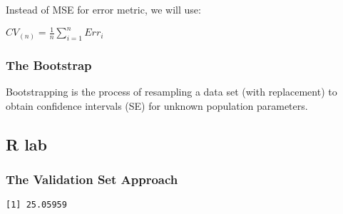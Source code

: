 \documentclass[12pt,]{report}
\newenvironment{Shaded}{\begin{snugshade}}{\end{snugshade}}
\newcommand{\CommentTok}[1]{\textcolor[rgb]{0.56,0.35,0.01}{\textit{#1}}}
\newcommand{\DataTypeTok}[1]{\textcolor[rgb]{0.13,0.29,0.53}{#1}}
\newcommand{\DecValTok}[1]{\textcolor[rgb]{0.00,0.00,0.81}{#1}}
\newcommand{\KeywordTok}[1]{\textcolor[rgb]{0.13,0.29,0.53}{\textbf{#1}}}
\newcommand{\NormalTok}[1]{#1}
\newcommand{\OperatorTok}[1]{\textcolor[rgb]{0.81,0.36,0.00}{\textbf{#1}}}
\newcommand{\StringTok}[1]{\textcolor[rgb]{0.31,0.60,0.02}{#1}}
\begin{document}
Instead of MSE for error metric, we will use:

\(CV_{(n)} = \frac{1}{n}\sum^{n}_{i=1}Err_i\)

\hypertarget{the-bootstrap}{%
\subsubsection{The Bootstrap}\label{the-bootstrap}}

Bootstrapping is the process of resampling a data set (with replacement)
to obtain confidence intervals (SE) for unknown population parameters.

\hypertarget{r-lab}{%
\subsection{R lab}\label{r-lab}}

\hypertarget{the-validation-set-approach-1}{%
\subsubsection{The Validation Set
Approach}\label{the-validation-set-approach-1}}

\begin{Shaded}
\end{Shaded}

\begin{verbatim}
[1] 25.05959
\end{verbatim}

\begin{Shaded}
\end{Shaded}
\end{document}
